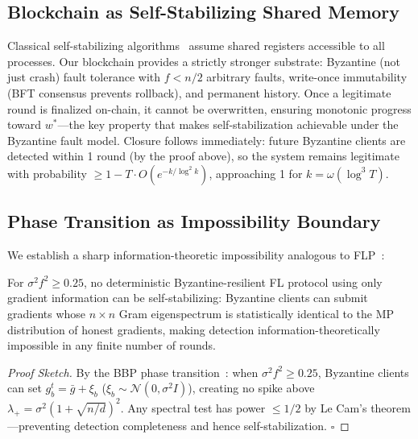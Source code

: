 \documentclass[runningheads]{llncs}
\begin{document}
\subsection{Blockchain as Self-Stabilizing Shared Memory}

Classical self-stabilizing algorithms~\cite{dijkstra_self_stab,dolev_self_stab} assume shared registers accessible to all processes. Our blockchain provides a strictly stronger substrate: Byzantine (not just crash) fault tolerance with $f < n/2$ arbitrary faults, write-once immutability (BFT consensus prevents rollback), and permanent history. Once a legitimate round is finalized on-chain, it cannot be overwritten, ensuring monotonic progress toward $w^*$---the key property that makes self-stabilization achievable under the Byzantine fault model. Closure follows immediately: future Byzantine clients are detected within 1 round (by the proof above), so the system remains legitimate with probability $\geq 1 - T \cdot O(e^{-k/\log^2 k})$, approaching 1 for $k = \omega(\log^3 T)$.

\subsection{Phase Transition as Impossibility Boundary}
\label{sec:impossibility}

We establish a sharp information-theoretic impossibility analogous to FLP~\cite{flp_impossibility}:

\begin{theorem}
\label{thm:phase_impossibility}
For $\sigma^2 f^2 \geq 0.25$, no deterministic Byzantine-resilient FL protocol using only gradient information can be self-stabilizing: Byzantine clients can submit gradients whose $n{\times}n$ Gram eigenspectrum is statistically identical to the MP distribution of honest gradients, making detection information-theoretically impossible in any finite number of rounds.
\end{theorem}

\begin{proof}[Proof Sketch]
By the BBP phase transition~\cite{rmt_covariance}: when $\sigma^2 f^2 \geq 0.25$, Byzantine clients can set $g_b^t = \bar{g} + \xi_b$ ($\xi_b \sim \mathcal{N}(0,\sigma^2 I)$), creating no spike above $\lambda_+ = \sigma^2(1+\sqrt{n/d})^2$. Any spectral test has power $\leq 1/2$ by Le Cam's theorem---preventing detection completeness and hence self-stabilization. \hfill$\square$
\end{proof}
\end{document}

